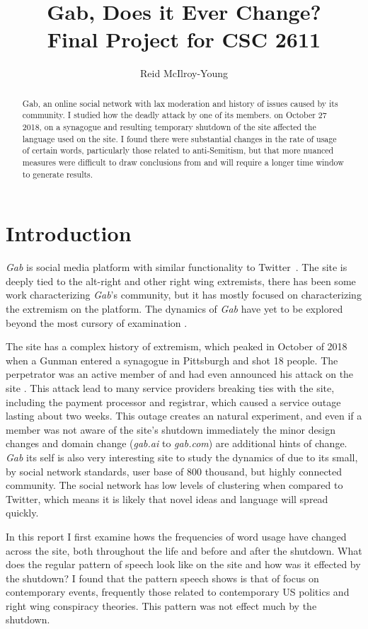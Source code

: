 \documentclass[letterpaper]{article}
\title{Gab, Does it Ever Change?\\Final Project for CSC 2611}
\author{Reid McIlroy-Young}
\begin{document}
	\maketitle

\begin{abstract}
	Gab, an online social network with lax moderation and history of issues caused by its community. I studied how the deadly attack by one of its members. on October 27 2018, on a synagogue and resulting temporary shutdown of the site affected the language used on the site. I found there were substantial changes in the rate of usage of certain words, particularly those related to anti-Semitism, but that more nuanced measures were difficult to draw conclusions from and will require a longer time window to generate results.
\end{abstract}
\section{Introduction}

\textit{Gab} is social media platform with similar functionality to Twitter~\cite{darroch2017}. The site is deeply tied to the alt-right and other right wing extremists, there has been some work characterizing \textit{Gab}'s community\cite{lima2018inside, zannettou2018gab}, but it has mostly focused on characterizing the extremism on the platform. The dynamics of \textit{Gab} have yet to be explored beyond the most cursory of examination \cite{reid2019}.

The site has a complex history of extremism, which peaked in October of 2018 when a Gunman entered a synagogue in Pittsburgh  and shot 18 people. The perpetrator was an active member of and had even announced his attack on the site \cite{gab_wapo}. This attack lead to many service providers breaking ties with the site, including the payment processor and registrar, which caused a service outage lasting about two weeks. This outage creates an natural experiment, and even if a member was not aware of the site's shutdown immediately the minor design changes and domain change (\textit{gab.ai} to \textit{gab.com}) are additional hints of change. \textit{Gab} its self is also very interesting site to study the dynamics of due to its small, by social network standards, user base of 800 thousand, but highly connected community. The social network has low levels of clustering when compared to Twitter, which means it is likely that novel ideas and language will spread quickly.

In this report I first examine hows the frequencies of word usage have changed across the site, both throughout the life and before and after the shutdown. What does the regular pattern of speech look like on the site and how was it effected by the shutdown? I found that the pattern speech shows is that of focus on contemporary events, frequently those related to contemporary US politics and right wing conspiracy theories. This pattern was not effect much by the shutdown. 
\end{document}
